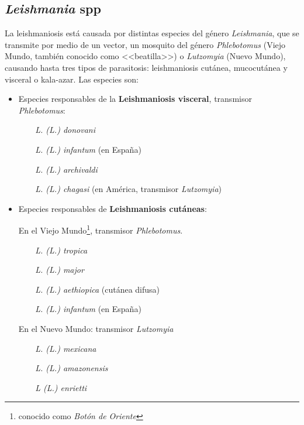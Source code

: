 \subsection{\textit{Leishmania} spp}
La leishmaniosis está causada por distintas especies del género \textit{Leishmania}, que se transmite por medio de un vector, un mosquito del género \textit{Phlebotomus} (Viejo Mundo, también conocido como <<beatilla>>) o \textit{Lutzomyia} (Nuevo Mundo), causando hasta tres tipos de parasitosis: leishmaniosis cutánea, mucocutánea y visceral o kala-azar. Las especies son:
\begin{itemize}[itemsep=0pt,parsep=0pt,topsep=0pt,partopsep=0pt] 
	\item Especies responsables de la \textbf{Leishmaniosis visceral}, transmisor \textit{Phlebotomus}:
	\begin{itemize}[itemsep=0pt,parsep=0pt,topsep=0pt,partopsep=0pt] 
		\item[$ $]	\textit{L. (L.) donovani}
		\item[$ $] \textit{L. (L.) infantum} (en España)
		\item[$ $] \textit{L. (L.) archivaldi}
		\item[$ $] \textit{L. (L.) chagasi} (en América, transmisor \textit{Lutzomyia})
	\end{itemize}
	\item Especies responsables de \textbf{Leishmaniosis cutáneas}:
	\vspace*{-0.5cm}
	\begin{multicols}{2}
		\subitem En el Viejo Mundo\footnote{conocido como \textit{Botón de Oriente}}, transmisor \textit{Phlebotomus}.
		\begin{itemize}[itemsep=0pt,parsep=0pt,topsep=0pt,partopsep=0pt]
			\item[$ $] \textit{L. (L.) tropica}
			\item[$ $] \textit{L. (L.) major}
			\item[$ $] \textit{L. (L.) aethiopica} (cutánea difusa)
			\item[$ $] \textit{L. (L.) infantum} (en España)
		\end{itemize}
		\columnbreak
		\subitem En el Nuevo Mundo: transmisor \textit{Lutzomyia}
		\begin{itemize}[itemsep=0pt,parsep=0pt,topsep=0pt,partopsep=0pt]
			\item[$ $] \textit{L. (L.) mexicana}
			\item[$ $] \textit{L. (L.) amazonensis}
			\item[$ $] \textit{L (L.) enrietti}

\end{itemize}
\end{multicols}
\end{itemize}
